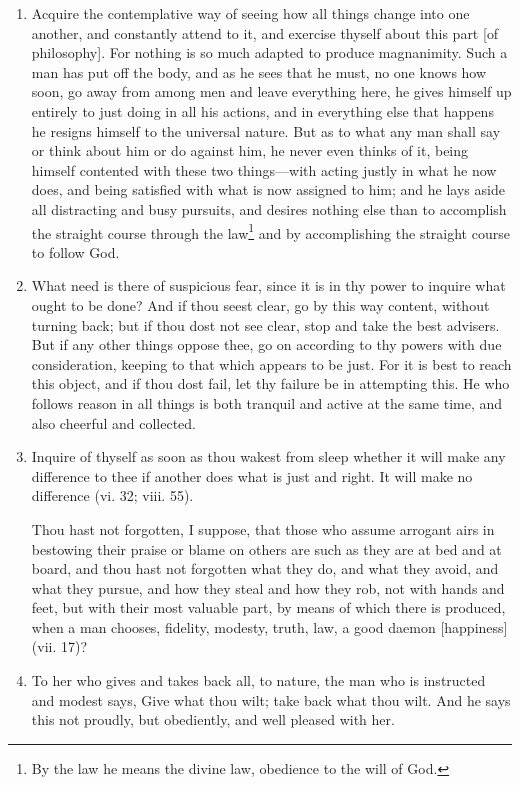 \begin{enumerate}
\item Acquire the contemplative way of seeing how all things change into one another, and constantly attend to it, and exercise thyself about this part [{\clarify of philosophy}]. For nothing is so much adapted to produce magnanimity. Such a man has put off the body, and as he sees that he must, no one knows how soon, go away from among men and leave everything here, he gives himself up entirely to just doing in all his actions, and in everything else that happens he resigns himself to the universal nature. But as to what any man shall say or think about him or do against him, he never even thinks of it, being himself contented with these two things—with acting justly in what he now does, and being satisfied with what is now assigned to him; and he lays aside all distracting and busy pursuits, and desires nothing else than to accomplish the straight course through the law\footnote{By the law he means the divine law, obedience to the will of God.} and by accomplishing the straight course to follow God.

\item What need is there of suspicious fear, since it is in thy power to inquire what ought to be done? And if thou seest clear, go by this way content, without turning back; but if thou dost not see clear, stop and take the best advisers. But if any other things oppose thee, go on according to thy powers with due consideration, keeping to that which appears to be just. For it is best to reach this object, and if thou dost fail, let thy failure be in attempting this. He who follows reason in all things is both tranquil and active at the same time, and also cheerful and collected.

\item Inquire of thyself as soon as thou wakest from sleep whether it will make any difference to thee if another does what is just and right. It will make no difference (vi. 32; viii. 55).

Thou hast not forgotten, I suppose, that those who assume arrogant airs in bestowing their praise or blame on others are such as they are at bed and at board, and thou hast not forgotten what they do, and what they avoid, and what they pursue, and how they steal and how they rob, not with hands and feet, but with their most valuable part, by means of which there is produced, when a man chooses, fidelity, modesty, truth, law, a good daemon [{\clarify happiness}] (vii. 17)?

\item To her who gives and takes back all, to nature, the man who is instructed and modest says, Give what thou wilt; take back what thou wilt. And he says this not proudly, but obediently, and well pleased with her.


\end{enumerate}
